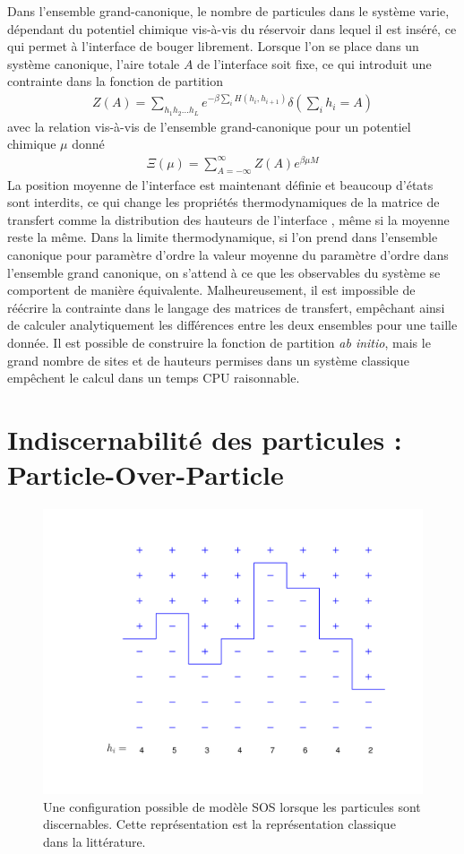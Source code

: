 Dans l'ensemble grand-canonique, le nombre de particules dans le système varie, dépendant du potentiel chimique vis-à-vis du réservoir dans lequel il est inséré, ce qui permet à l'interface de bouger librement. Lorsque l'on se place dans un système canonique, l'aire totale $A$ de l'interface soit fixe, ce qui introduit une contrainte dans la fonction de partition
\begin{align}
	 Z(A) = \sum_{h_1 h_2 ... h_L} e^{- \beta \sum_{i} H(h_i,h_{i+1})}  \delta(\sum_i h_i = A)
\end{align}
avec la relation vis-à-vis de l'ensemble grand-canonique pour un potentiel chimique $\mu$ donné
\begin{align}
	 \Xi(\mu) = \sum_{A = -\infty}^\infty Z(A) e^{\beta \mu M}
\end{align}
La position moyenne de l'interface est maintenant définie et beaucoup d'états sont interdits, ce qui change  les propriétés thermodynamiques de la matrice de transfert comme la distribution des hauteurs de l'interface \cite{siegert_scaling_1993}, même si la moyenne reste la même. Dans la limite thermodynamique, si l'on prend dans l'ensemble canonique pour paramètre d'ordre la valeur moyenne du paramètre d'ordre dans l'ensemble grand canonique, on s'attend à ce que les observables du système se comportent de manière équivalente. 
Malheureusement, il est impossible de réécrire la contrainte dans le langage des matrices de transfert, empêchant ainsi de calculer analytiquement les différences entre les deux ensembles pour une taille donnée. Il est possible de construire la fonction de partition \textit{ab initio}, mais le grand nombre de sites et de hauteurs permises dans un système classique empêchent le calcul dans un temps CPU raisonnable. 


	\section{Indiscernabilité des particules : Particle-Over-Particle}

\begin{figure}[h]
	\centering
	\includegraphics[width=0.7\linewidth]{isingtosos/figure-sos.pdf}
	\caption{Une configuration possible de modèle SOS lorsque les particules sont discernables. Cette représentation est la représentation classique dans la littérature.}
\end{figure}	
	
